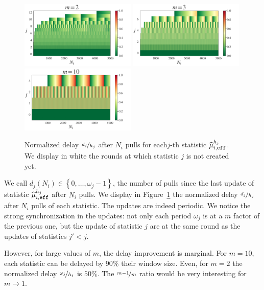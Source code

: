 \begin{figure}[ht]
\centering
\includegraphics[clip, width= 0.49\textwidth]{3Rested/fig/T=5000_m=2.pdf}
\includegraphics[clip, width= 0.49\textwidth]{3Rested/fig/T=5000_m=3.pdf}
\includegraphics[clip, width= 0.49\textwidth]{3Rested/fig/T=5000_m=10.pdf}
\caption{Normalized delay $\nicefrac{d_j}{h_j}$ after $N_i$ pulls for each$j$-th statistic $\widehat{\mu}_{i,\texttt{\footnotesize{eff}}}^{h_j}$. We display in white the rounds at which statistic $j$ is not created yet.}
\label{fig:delay-int}
\end{figure}

We call $d_j(N_i) \in \left\{0, \dots, \omega_j-1 \right\}$, the number of pulls since the last update of statistic $\widehat{\mu}_{i,\texttt{\footnotesize{eff}}}^{h_j}$ after $N_i$ pulls. We display in Figure~\ref{fig:delay-int}  
the normalized delay $\nicefrac{d_j}{h_j}$ after $N_i$ pulls of each statistic. The updates are indeed periodic. We notice the strong synchronization in the updates: not only each period $\omega_j$ is at a $m$ factor of the previous one, but the update of statistic $j$ are at the same round as the updates of statistics $j'<j$. %

However, for large values of $m$, the delay improvement is marginal. For $m=10$, each statistic can be delayed by $90\%$ their window size. Even, for $m=2$ the normalized delay $\nicefrac{\omega_j}{h_j}$ is $50\%$. The $\nicefrac{m-1}{m}$ ratio would be very interesting for $m \rightarrow 1$. 

